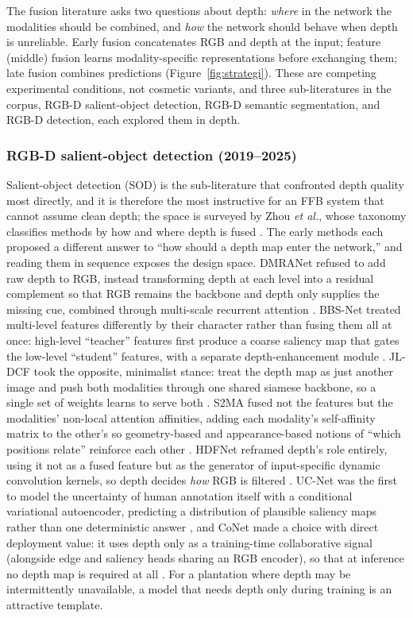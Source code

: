 The fusion literature asks two questions about depth: \emph{where} in the network the modalities should be combined, and \emph{how} the network should behave when depth is unreliable. Early fusion concatenates RGB and depth at the input; feature (middle) fusion learns modality-specific representations before exchanging them; late fusion combines predictions (Figure~\ref{fig:strategi}). These are competing experimental conditions, not cosmetic variants, and three sub-literatures in the corpus, RGB-D salient-object detection, RGB-D semantic segmentation, and RGB-D detection, each explored them in depth.

\subsubsection{RGB-D salient-object detection (2019--2025)}

Salient-object detection (SOD) is the sub-literature that confronted depth quality most directly, and it is therefore the most instructive for an FFB system that cannot assume clean depth; the space is surveyed by Zhou \textit{et al.}, whose taxonomy classifies methods by how and where depth is fused \cite{zhou2021rgbdsurvey}. The early methods each proposed a different answer to ``how should a depth map enter the network,'' and reading them in sequence exposes the design space. DMRANet refused to add raw depth to RGB, instead transforming depth at each level into a residual complement so that RGB remains the backbone and depth only supplies the missing cue, combined through multi-scale recurrent attention \cite{piao2019dmra}. BBS-Net treated multi-level features differently by their character rather than fusing them all at once: high-level ``teacher'' features first produce a coarse saliency map that gates the low-level ``student'' features, with a separate depth-enhancement module \cite{fan2020bbsnet}. JL-DCF took the opposite, minimalist stance: treat the depth map as just another image and push both modalities through one shared siamese backbone, so a single set of weights learns to serve both \cite{fu2020jldcf}. S2MA fused not the features but the modalities' non-local attention affinities, adding each modality's self-affinity matrix to the other's so geometry-based and appearance-based notions of ``which positions relate'' reinforce each other \cite{liu2020s2ma}. HDFNet reframed depth's role entirely, using it not as a fused feature but as the generator of input-specific dynamic convolution kernels, so depth decides \emph{how} RGB is filtered \cite{pang2020hdfnet}. UC-Net was the first to model the uncertainty of human annotation itself with a conditional variational autoencoder, predicting a distribution of plausible saliency maps rather than one deterministic answer \cite{zhang2020ucnet}, and CoNet made a choice with direct deployment value: it uses depth only as a training-time collaborative signal (alongside edge and saliency heads sharing an RGB encoder), so that at inference no depth map is required at all \cite{ji2020conet}. For a plantation where depth may be intermittently unavailable, a model that needs depth only during training is an attractive template.

